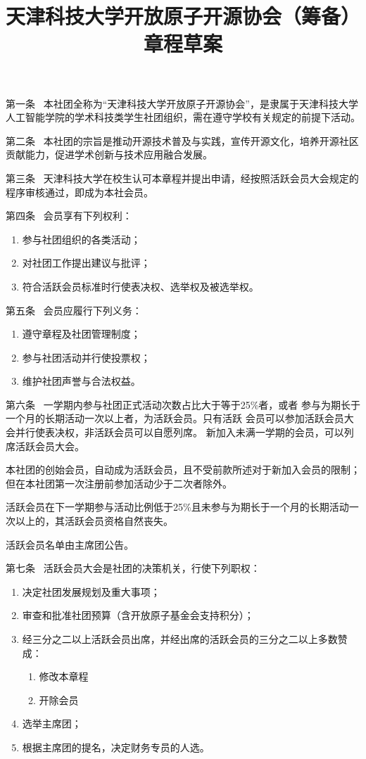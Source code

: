 \documentclass{gbt9704}
\title{天津科技大学开放原子开源协会（筹备）章程草案}
\begin{document}
\maketitle


第一条~ 本社团全称为“天津科技大学开放原子开源协会”，是隶属于天津科技大学人工智能学院的学术科技类学生社团组织，需在遵守学校有关规定的前提下活动。


第二条~ 本社团的宗旨是推动开源技术普及与实践，宣传开源文化，培养开源社区贡献能力，促进学术创新与技术应用融合发展。


第三条~ 天津科技大学在校生认可本章程并提出申请，经按照活跃会员大会规定的程序审核通过，即成为本社会员。


第四条~ 会员享有下列权利：
\begin{enumerate}
    \item 参与社团组织的各类活动；
    \item 对社团工作提出建议与批评；
    \item 符合活跃会员标准时行使表决权、选举权及被选举权。
\end{enumerate}


第五条~ 会员应履行下列义务：
\begin{enumerate}
    \item 遵守章程及社团管理制度；
    \item 参与社团活动并行使投票权；
    \item 维护社团声誉与合法权益。
\end{enumerate}


第六条~ 一学期内参与社团正式活动次数占比大于等于25\%者，或者
参与为期长于一个月的长期活动一次以上者，为活跃会员。只有活跃
会员可以参加活跃会员大会并行使表决权，非活跃会员可以自愿列席。
新加入未满一学期的会员，可以列席活跃会员大会。


本社团的创始会员，自动成为活跃会员，且不受前款所述对于新加入会员的限制；但在本社团第一次注册前参加活动少于二次者除外。


活跃会员在下一学期参与活动比例低于25\%且未参与为期长于一个月的长期活动一次以上的，其活跃会员资格自然丧失。


活跃会员名单由主席团公告。


第七条~ 活跃会员大会是社团的决策机关，行使下列职权：
\begin{enumerate}
    \item 决定社团发展规划及重大事项；
    \item 审查和批准社团预算（含开放原子基金会支持积分）；
    \item 经三分之二以上活跃会员出席，并经出席的活跃会员的三分之二以上多数赞成：
        \begin{enumerate}
            \item 修改本章程
            \item 开除会员
        \end{enumerate}
    \item 选举主席团；
    \item 根据主席团的提名，决定财务专员的人选。
\end{enumerate}
\end{document}
